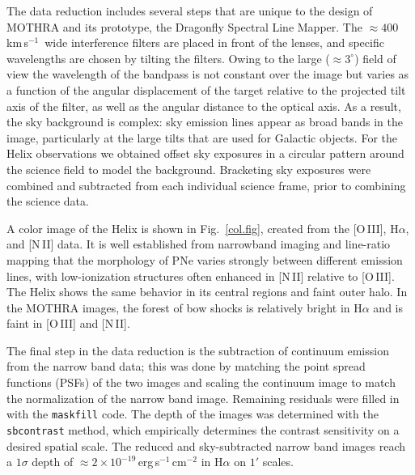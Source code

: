\documentclass{nature_arxiv}
\newcommand{\kms}{km\,s$^{-1}$}
\begin{document}
\begin{methods}
The data reduction includes several steps that are unique to
the design of MOTHRA and its prototype, the Dragonfly Spectral Line
Mapper.\cite{lokhorst:24,chen:25}
The $\approx 400$\,\kms\ wide
interference filters are placed in front of the lenses,
and specific wavelengths are chosen
by tilting the filters. Owing to the large
($\approx 3^{\circ}$) field of view
the wavelength of the bandpass is not constant over the image
but varies as a function of the angular displacement of the target relative to the projected tilt axis of the filter, as well as the angular distance
to the optical axis.
As a result, the sky background is complex:
sky emission lines appear as broad bands in the image,
particularly at the large tilts that are used for Galactic objects.\cite{lokhorst:24}
For the Helix observations we obtained offset sky exposures in a circular
pattern around the science field to model the background. Bracketing
sky exposures were combined and subtracted from each individual science frame,
prior to combining the science data.

A color image of the Helix is shown in Fig.\ \ref{col.fig}, created from
the [O\,III], H$\alpha$, and [N\,II] data.
It is well established from narrowband imaging and line-ratio mapping that the
morphology of PNe
varies strongly between different emission lines, with low-ionization structures often enhanced in [N\,II] relative to [O\,III].\cite{balick87,corradi96,goncalves01}
The Helix shows the same behavior in its central regions and faint outer halo.\cite{odell:04,richer08,vandesteene15}
In the MOTHRA images, the forest of bow shocks is relatively bright
in H$\alpha$ and is faint in [O\,III] and [N\,II].

The final step in the data reduction is the subtraction of continuum emission
from the narrow band data;
this was done by matching the point spread functions (PSFs) of the two images
and scaling the continuum image to match the normalization of the narrow band
image. Remaining residuals were filled in with the {\tt maskfill} code.\cite{maskfill}
The depth of the images was determined with the {\tt sbcontrast} method,
which empirically determines the contrast sensitivity on a desired spatial
scale.\cite{keim:22} The reduced and sky-subtracted narrow band images
reach a $1\sigma$ depth of
$\approx 2\times 10^{-19}$\,erg\,s$^{-1}$\,cm$^{-2}$
in H$\alpha$ on $1'$ scales.












\end{methods}
\end{document}
